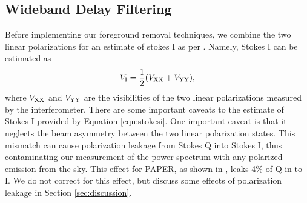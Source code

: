 \documentclass[twocolumn,numberedappendix]{emulateapj} \shorttitle{PSA64}
\begin{document}
%
%



\subsection{Wideband Delay Filtering}\label{sec:wbd_filtering}


Before implementing our foreground removal techniques, we combine the two
linear polarizations for an estimate of stokes I as per \citet{moore_et_al2013}.
Namely, Stokes I can be estimated as 
\begin{equation}\label{eqn:stokesi}
    V_{\rm I} = \frac12(V_{\rm XX}+V_{\rm YY}),
\end{equation}
where $V_{\rm XX}$ and $V_{\rm YY}$ are the visibilities of the two linear
polarizations measured by the interferometer. There are some important caveats
to the estimate of Stokes I provided by Equation \eqref{eqn:stokesi}. One
important caveat is that it neglects the beam asymmetry  between the two linear
polarization states. This mismatch can cause polarization leakage from Stokes
Q into Stokes I, thus contaminating  our measurement of the power spectrum with any polarized emission from the sky.
This effect for PAPER, as shown in \citet{moore_et_al2013}, leaks 4\% of Q in to
I.  We do not correct for this effect, but discuss some effects of 
polarization leakage in Section \ref{sec:discussion}. 
\end{document}
